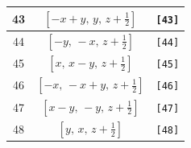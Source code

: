 \documentclass[fleqn,8pt]{jsarticle}
\begin{document}
\begin{longtable}{ccc}
43 & $\left[ - x + y,\, y,\, z + \frac{1}{2} \right]$ & {\tt [43]} \\ \hline
44 & $\left[ - y,\, - x,\, z + \frac{1}{2} \right]$ & {\tt [44]} \\ \hline
45 & $\left[ x,\, x - y,\, z + \frac{1}{2} \right]$ & {\tt [45]} \\ \hline
46 & $\left[ - x,\, - x + y,\, z + \frac{1}{2} \right]$ & {\tt [46]} \\ \hline
47 & $\left[ x - y,\, - y,\, z + \frac{1}{2} \right]$ & {\tt [47]} \\ \hline
48 & $\left[ y,\, x,\, z + \frac{1}{2} \right]$ & {\tt [48]} \\
\end{longtable}
\end{document}

